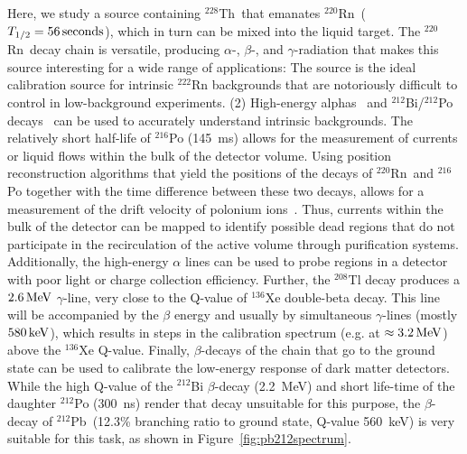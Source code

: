 Here, we study a source containing $^{228}$Th~that emanates $^{220}$Rn~($T_{1/2}=56\,\mathrm{seconds}$), which in turn can be mixed into the liquid target. The $^{220}$Rn~decay chain is versatile, producing $\alpha$-, $\beta$-, and $\gamma$-radiation that makes this source interesting for a wide range of applications: The source is the ideal calibration source for intrinsic $^{222}$Rn backgrounds that are notoriously difficult to control in low-background experiments. (2) High-energy alphas~\cite{WeberM:2013,Albert:2015vma} and $^{212}$Bi/$^{212}$Po decays~\cite{Bellini:2012qg} can be used to accurately understand intrinsic backgrounds. The relatively short half-life of $^{216}$Po (145~ms) allows for the measurement of currents or liquid flows within the bulk of the detector volume. Using position reconstruction algorithms that yield the positions of the decays of $^{220}$Rn~and $^{216}$Po together with the time difference between these two decays, allows for a measurement of the drift velocity of polonium ions~\cite{Albert:2015vma}. Thus, currents within the bulk of the detector can be mapped to identify possible dead regions that do not participate in the recirculation of the active volume through purification systems. Additionally, the high-energy $\alpha$ lines can be used to probe regions in a detector with poor light or charge collection efficiency. Further, the $^{208}$Tl decay produces a $2.6\,\mathrm{MeV}$ $\gamma$-line, very close to the Q-value of $^{136}$Xe double-beta decay. This line will be accompanied by the $\beta$ energy and usually by simultaneous $\gamma$-lines (mostly $580\,\mathrm{keV}$), which results in steps in the calibration spectrum (e.g. at $\approx 3.2\,\mathrm{MeV}$) above the $^{136}$Xe Q-value. Finally, $\beta$-decays of the chain that go to the ground state can be used to calibrate the low-energy response of dark matter detectors. While the high Q-value of the $^{212}$Bi $\beta$-decay (2.2~MeV) and short life-time of the daughter $^{212}$Po (300~ns) render that decay unsuitable for this purpose, the $\beta$-decay of $^{212}$Pb~(12.3\% branching ratio to ground state, Q-value 560~keV) is very suitable for this task, as shown in Figure~\ref{fig:pb212spectrum}.

